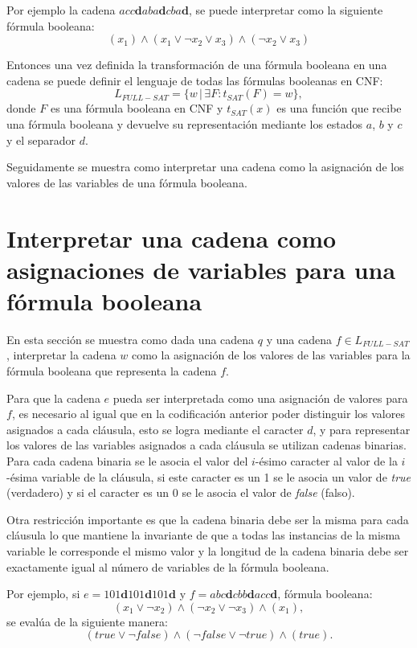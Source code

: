 Por ejemplo la cadena $acc\mathbf{d}aba\mathbf{d}cba\mathbf{d}$, se puede interpretar como la siguiente fórmula booleana:
$$(x_1)\wedge(x_1\vee \neg x_2 \vee x_3) \wedge (\neg x_2\vee x_3)$$

Entonces una vez definida la transformación de una fórmula booleana en una cadena se puede definir el lenguaje
de todas las fórmulas booleanas en CNF:
$$L_{FULL-SAT}=\{w\,|\,\exists F : t_{SAT}(F)=w\},$$
donde $F$ es una fórmula booleana en CNF y $t_{SAT}(x)$ es una función que recibe una fórmula booleana y devuelve
su representación mediante los estados $a$, $b$ y $c$ y el separador $d$.

Seguidamente se muestra como interpretar una cadena como la asignación de los valores de las variables de una fórmula
booleana.

\section{Interpretar una cadena como asignaciones de variables para una fórmula booleana}
\label{sec:intsat}

En esta sección se muestra como dada una cadena $q$ y una cadena $f\in L_{FULL-SAT}$, interpretar
la cadena $w$ como la asignación de los valores de las variables para la fórmula booleana que representa
la cadena $f$.

Para que la cadena $e$ pueda ser interpretada como una asignación de valores para $f$, es necesario al igual
que en la codificación anterior poder distinguir los valores asignados a cada cláusula, esto se logra mediante
el caracter $d$, y para representar los valores de las variables asignados a cada cláusula se utilizan
cadenas binarias. Para cada cadena binaria se le asocia el valor del $i$-ésimo caracter al valor de la $i$-ésima
variable de la cláusula, si este caracter es un 1 se le asocia un valor de \textit{true} (verdadero) y si el
caracter es un 0 se le asocia el valor de \textit{false} (falso).

Otra restricción importante es que la cadena
binaria debe ser la misma para cada cláusula lo que mantiene la invariante de que a todas las instancias de la misma
variable le corresponde el mismo valor y la longitud de la cadena binaria debe ser exactamente igual al número de
variables de la fórmula booleana.

Por ejemplo, si $e=101\mathbf{d}101\mathbf{d}101\mathbf{d}$ y $f=abc\mathbf{d}cbb\mathbf{d}acc\mathbf{d}$, fórmula booleana:
$$(x_1\vee\neg x_2)\wedge (\neg x_2 \vee \neg x_3)\wedge (x_1),$$
se evalúa de la siguiente manera:
$$(true\vee\neg false)\wedge (\neg false \vee \neg true)\wedge (true).$$

